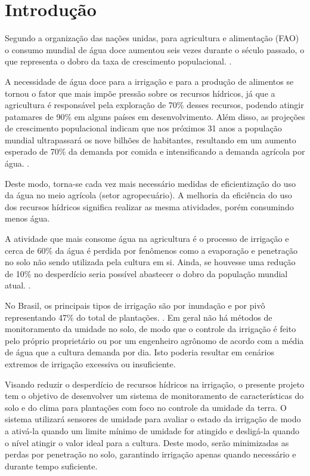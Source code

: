 \chapter*[Introdução]{Introdução}


Segundo a organização das nações unidas, para agricultura e alimentação (FAO) o consumo mundial de água doce aumentou seis vezes durante o século passado, o que representa o dobro da taxa de crescimento populacional. \cite{bib_04}. 

A necessidade de água doce para a irrigação e para a produção de alimentos se tornou o fator que mais impõe pressão sobre os recursos hídricos, já que a agricultura é responsável pela exploração de 70\% desses recursos, podendo atingir patamares de 90\% em alguns países em desenvolvimento. \cite{bib_02} Além disso, as projeções de crescimento populacional indicam que nos próximos 31 anos a população mundial ultrapassará os nove bilhões de habitantes, resultando em um aumento esperado de 70\% da demanda por comida e intensificando a demanda agrícola por água.  \cite{bib_03}.

Deste modo, torna-se cada vez mais necessário medidas de eficientização do uso da água no meio agrícola (setor agropecuário). A melhoria da eficiência do uso dos recursos hídricos significa realizar as mesma atividades, porém consumindo menos água.

A atividade que mais consome água na agricultura é o processo de irrigação e cerca de 60\% da água é perdida por fenômenos como a evaporação e penetração no solo não sendo utilizada pela cultura em si. Ainda, se houvesse uma redução de 10\% no desperdício seria possível abastecer o dobro da população mundial atual. \cite{bib_05}.

 No Brasil, os principais tipos de irrigação são por inundação e por pivô representando 47\% do total de plantações. \cite{bib_01}. Em geral não há métodos de monitoramento da umidade no solo, de modo que o controle da irrigação é feito pelo próprio proprietário ou por um engenheiro agrônomo de acordo com a média de água que a cultura demanda por dia. Isto poderia resultar em cenários extremos de irrigação excessiva ou insuficiente.
 
 Visando reduzir o desperdício de recursos hídricos na irrigação, o presente projeto tem o objetivo de desenvolver um sistema de monitoramento de características do solo e do clima para plantações com foco no controle da umidade da terra. O sistema utilizará sensores de umidade para avaliar o estado da irrigação de modo a ativá-la quando um limite mínimo de umidade for atingido e desligá-la quando o nível atingir o valor ideal para a cultura. Deste modo, serão minimizadas as perdas por penetração no solo, garantindo irrigação apenas quando necessário e durante tempo suficiente.
 
